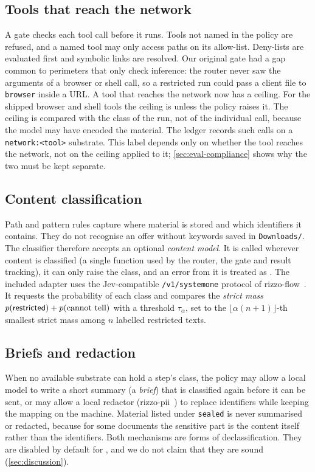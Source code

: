 \subsection{Tools that reach the network}

A gate checks each tool call before it runs. Tools not named in the policy are refused, and a
named tool may only access paths on its allow-list. Deny-lists are evaluated first and
symbolic links are resolved. Our original gate had a gap common to perimeters that only check
inference: the router never saw the arguments of a browser or shell call, so a restricted run
could pass a client file to \texttt{browser} inside a URL. A tool that reaches the network now
has a ceiling. For the shipped browser and shell tools the ceiling is \pub{} unless the policy
raises it. The ceiling is compared with the class of the run, not of the individual call,
because the model may have encoded the material. The ledger records such calls on a
\texttt{network:<tool>} substrate. This label depends only on whether the tool reaches the
network, not on the ceiling applied to it; \cref{sec:eval-compliance} shows why the two must
be kept separate.

\subsection{Content classification}

Path and pattern rules capture where material is stored and which identifiers it contains. They
do not recognise an offer without keywords saved in \texttt{Downloads/}. The classifier
therefore accepts an optional \emph{content model}. It is called wherever content is
classified (a single function used by the router, the gate and result tracking), it can only
raise the class, and an error from it is treated as \res. The included adapter uses the
Jev-compatible \texttt{/v1/systemone} protocol of rizzo-flow~\citep{rizzoflow}. It requests the
probability of each class and compares the \emph{strict mass} $p(\textsf{restricted}) + p(\text{cannot tell})$
with a threshold $\tau_\alpha$, set to the $\lfloor \alpha(n+1) \rfloor$-th smallest strict
mass among $n$ labelled restricted texts.

\subsection{Briefs and redaction}

When no available substrate can hold a step's class, the policy may allow a local model to
write a short summary (a \emph{brief}) that is classified again before it can be sent, or may
allow a local redactor (rizzo-pii~\citep{rizzopii}) to replace identifiers while keeping the
mapping on the machine. Material listed under \texttt{sealed} is never summarised or redacted,
because for some documents the sensitive part is the content itself rather than the
identifiers. Both mechanisms are forms of declassification. They are disabled by default for
\res, and we do not claim that they are sound (\cref{sec:discussion}).

